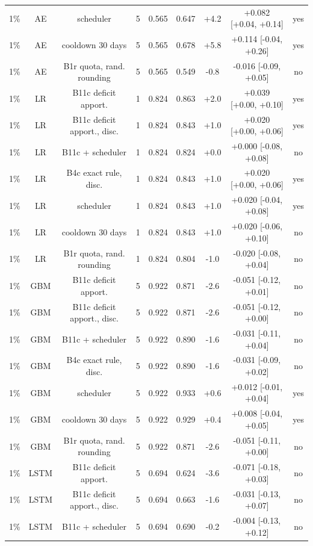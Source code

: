 \documentclass[10pt,onecolumn,letterpaper]{article}
\begin{document}
\begin{table}[!t]
{\begin{tabular}{lcccccccc}
1\% & AE & scheduler & 5 & 0.565 & 0.647 & +4.2 & +0.082 [+0.04, +0.14] & yes \\
1\% & AE & cooldown 30 days & 5 & 0.565 & 0.678 & +5.8 & +0.114 [-0.04, +0.26] & yes \\
1\% & AE & B1r quota, rand. rounding & 5 & 0.565 & 0.549 & -0.8 & -0.016 [-0.09, +0.05] & no \\
1\% & LR & B11c deficit apport. & 1 & 0.824 & 0.863 & +2.0 & +0.039 [+0.00, +0.10] & yes \\
1\% & LR & B11c deficit apport., disc. & 1 & 0.824 & 0.843 & +1.0 & +0.020 [+0.00, +0.06] & yes \\
1\% & LR & B11c + scheduler & 1 & 0.824 & 0.824 & +0.0 & +0.000 [-0.08, +0.08] & no \\
1\% & LR & B4c exact rule, disc. & 1 & 0.824 & 0.843 & +1.0 & +0.020 [+0.00, +0.06] & yes \\
1\% & LR & scheduler & 1 & 0.824 & 0.843 & +1.0 & +0.020 [-0.04, +0.08] & yes \\
1\% & LR & cooldown 30 days & 1 & 0.824 & 0.843 & +1.0 & +0.020 [-0.06, +0.10] & no \\
1\% & LR & B1r quota, rand. rounding & 1 & 0.824 & 0.804 & -1.0 & -0.020 [-0.08, +0.04] & no \\
1\% & GBM & B11c deficit apport. & 5 & 0.922 & 0.871 & -2.6 & -0.051 [-0.12, +0.01] & no \\
1\% & GBM & B11c deficit apport., disc. & 5 & 0.922 & 0.871 & -2.6 & -0.051 [-0.12, +0.00] & no \\
1\% & GBM & B11c + scheduler & 5 & 0.922 & 0.890 & -1.6 & -0.031 [-0.11, +0.04] & no \\
1\% & GBM & B4c exact rule, disc. & 5 & 0.922 & 0.890 & -1.6 & -0.031 [-0.09, +0.02] & no \\
1\% & GBM & scheduler & 5 & 0.922 & 0.933 & +0.6 & +0.012 [-0.01, +0.04] & yes \\
1\% & GBM & cooldown 30 days & 5 & 0.922 & 0.929 & +0.4 & +0.008 [-0.04, +0.05] & yes \\
1\% & GBM & B1r quota, rand. rounding & 5 & 0.922 & 0.871 & -2.6 & -0.051 [-0.11, +0.00] & no \\
1\% & LSTM & B11c deficit apport. & 5 & 0.694 & 0.624 & -3.6 & -0.071 [-0.18, +0.03] & no \\
1\% & LSTM & B11c deficit apport., disc. & 5 & 0.694 & 0.663 & -1.6 & -0.031 [-0.13, +0.07] & no \\
1\% & LSTM & B11c + scheduler & 5 & 0.694 & 0.690 & -0.2 & -0.004 [-0.13, +0.12] & no \\

\end{tabular}}
\end{table}
\end{document}
